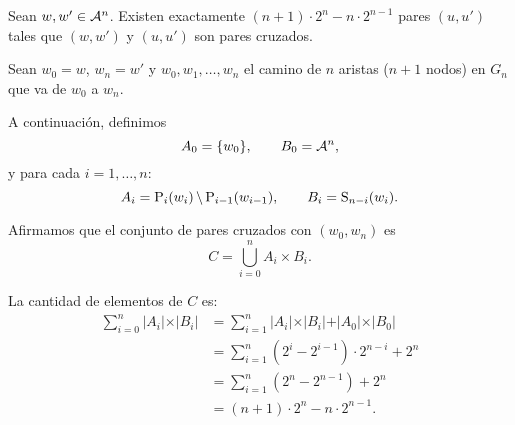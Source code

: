 \begin{prop}
  Sean $w, w' \in \mathcal{A}^n$. Existen exactamente $(n + 1) \cdot 2^n - n
    \cdot 2^{n - 1}$ pares $(u, u')$ tales que $(w, w')$ y $(u, u')$ son pares
  cruzados.
\end{prop}

\begin{demo}
  Sean $w_0 = w$, $w_n = w'$ y $w_0, w_1, \dots, w_n$ el camino de
  $n$ aristas ($n + 1$ nodos) en $G_n$ que va de $w_0$ a $w_n$.

  A continuación, definimos
  \[ A_0 = \lbrace w_0 \rbrace, \qquad
    B_0 = \mathcal{A}^n, \]
  y para cada $i = 1, \dots, n$:
  \[ A_i = \text{P}_{i}(w_i) \,\backslash\, \text{P}_{i - 1}(w_{i - 1}), \qquad
    B_i = \text{S}_{n - i}(w_i). \]

  Afirmamos que el conjunto de pares cruzados con $(w_0, w_n)$ es
  \[ C = \bigcup_{i = 0}^n A_i \times B_i. \]

  La cantidad de elementos de $C$ es:
  \begin{align*}
    \sum_{i = 0}^n \vert A_i \vert \times \vert B_i \vert
     & = \sum_{i = 1}^n \vert A_i \vert \times \vert B_i \vert + \vert A_0
    \vert \times \vert B_0 \vert                                           \\
     & = \sum_{i = 1}^n \left( 2^{i} - 2^{i - 1} \right) \cdot 2^{n - i} +
    2^n                                                                    \\
     & = \sum_{i = 1}^n \left( 2^n - 2^{n - 1} \right) + 2^n               \\
     & = (n + 1) \cdot 2^n - n \cdot 2^{n - 1}.
  \end{align*}
\end{demo}
